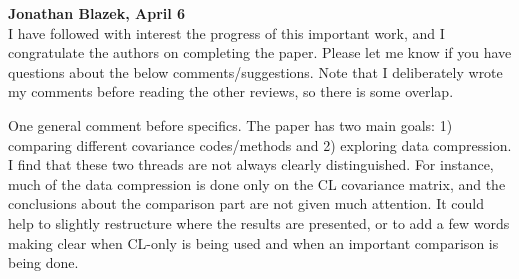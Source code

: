 \documentclass{article}
\begin{document}
	\textbf{Jonathan Blazek, April 6} \\
	
	I have followed with interest the progress of this important work, and I congratulate the authors on completing the paper. Please let me know if you have questions about the below comments/suggestions. Note that I deliberately wrote my comments before reading the other reviews, so there is some overlap.
	
	One general comment before specifics. The paper has two main goals: 1) comparing different covariance codes/methods and 2) exploring data compression. I find that these two threads are not always clearly distinguished. For instance, much of the data compression is done only on the CL covariance matrix, and the conclusions about the comparison part are not given much attention. It could help to slightly restructure where the results are presented, or to add a few words making clear when CL-only is being used and when an important comparison is being done.
	
\end{document}
